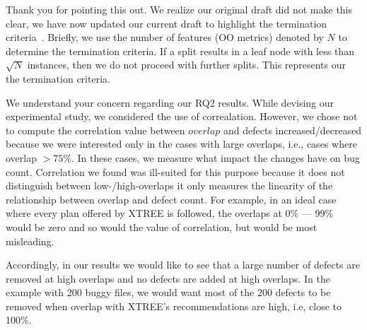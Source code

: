 Thank you for pointing this out. We realize our original draft did not make this clear, we have now updated our current draft to highlight the termination criteria~. Briefly, we use the number of features (OO metrics) denoted by $N$ to determine the termination criteria. If a split results in a leaf node with less than $\sqrt{N}$ instances, then we do not proceed with further splits. This represents our the termination criteria. 


We understand your concern regarding our RQ2 results. While devising our experimental study, we considered the use of correalation. However, we chose not to compute the correlation value between $\mathit{overlap}$ and defects increased/decreased because we were interested only in the cases with large overlaps, i.e., cases where overlap $>75\%$. In these cases, we measure what impact the changes have on bug count. Correlation we found was ill-suited for this purpose because it does not distinguish between low-/high-overlaps it only measures the linearity of the relationship between overlap and defect count. For example, in an ideal case where every plan offered by XTREE is followed, the overlaps at 0\% --- 99\% would be zero and so would the value of correlation, but would be most misleading. 

Accordingly, in our results we would like to see that a large number of defects are removed at high overlaps and no defects are added at high overlaps. In the example with 200 buggy files, we would want most of the 200 defects to be removed when overlap with XTREE's recommendations are high, i.e, close to 100\%. 

